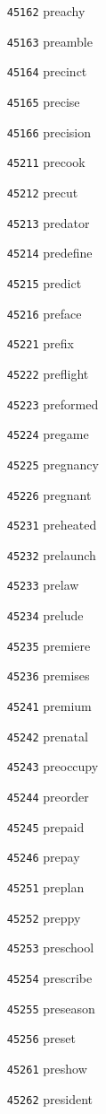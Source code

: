 \documentclass[twoside,11pt]{article}
\begin{document}
\begin{multicols}{5}
\begin{enumerate}
\item[\texttt{45162}] preachy
\item[\texttt{45163}] preamble
\item[\texttt{45164}] precinct
\item[\texttt{45165}] precise
\item[\texttt{45166}] precision
\item[\texttt{45211}] precook
\item[\texttt{45212}] precut
\item[\texttt{45213}] predator
\item[\texttt{45214}] predefine
\item[\texttt{45215}] predict
\item[\texttt{45216}] preface
\item[\texttt{45221}] prefix
\item[\texttt{45222}] preflight
\item[\texttt{45223}] preformed
\item[\texttt{45224}] pregame
\item[\texttt{45225}] pregnancy
\item[\texttt{45226}] pregnant
\item[\texttt{45231}] preheated
\item[\texttt{45232}] prelaunch
\item[\texttt{45233}] prelaw
\item[\texttt{45234}] prelude
\item[\texttt{45235}] premiere
\item[\texttt{45236}] premises
\item[\texttt{45241}] premium
\item[\texttt{45242}] prenatal
\item[\texttt{45243}] preoccupy
\item[\texttt{45244}] preorder
\item[\texttt{45245}] prepaid
\item[\texttt{45246}] prepay
\item[\texttt{45251}] preplan
\item[\texttt{45252}] preppy
\item[\texttt{45253}] preschool
\item[\texttt{45254}] prescribe
\item[\texttt{45255}] preseason
\item[\texttt{45256}] preset
\item[\texttt{45261}] preshow
\item[\texttt{45262}] president

\end{enumerate}
\end{multicols}
\end{document}
